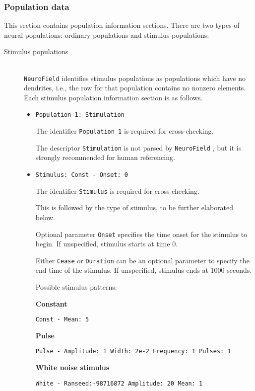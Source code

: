 \documentclass[12pt,a4paper]{article}
\newcommand{\type}[1]{ {\small\small\tt #1} }
\newcommand{\NF}[0]{ \type{NeuroField}}
\begin{document}
\subsubsection{Population data}
\label{sec:pop}
This section contains population information sections. There are two types of neural populations: ordinary populations and stimulus populations:
\begin{description}

\item[Stimulus populations]\ \\

\NF identifies stimulus populations as populations which have no dendrites, i.e., the row for that population contains no nonzero elements.  Each stimulus population information section is as follows.
\begin{itemize}
	\item \begin{lstlisting}
Population 1: Stimulation
	\end{lstlisting}
	The identifier \type{Population 1} is required for cross-checking.

	The descriptor \type{Stimulation} is not parsed by \NF, but it is strongly recommended for human referencing.
	\item
	\begin{lstlisting}
Stimulus: Const - Onset: 0
	\end{lstlisting}
	The identifier \type{Stimulus} is required for cross-checking.

	This is followed by the type of stimulus, to be further elaborated below.

	Optional parameter \type{Onset} specifies the time onset for the stimulus to begin. If unspecified, stimulus starts at time 0.

	Either \type{Cease} or \type{Duration} can be an optional parameter to specify the end time of the stimulus. If unspecified, stimulus ends at 1000 seconds.

	Possible stimulus patterns:

	\textbf{Constant}
	\begin{lstlisting}
Const - Mean: 5
	\end{lstlisting}

	\textbf{Pulse}
	\begin{lstlisting}
Pulse - Amplitude: 1 Width: 2e-2 Frequency: 1 Pulses: 1
	\end{lstlisting}

	\textbf{White noise stimulus}
	\begin{lstlisting}
White - Ranseed:-98716872 Amplitude: 20 Mean: 1
	\end{lstlisting}


\end{itemize}
\end{description}
\end{document}
